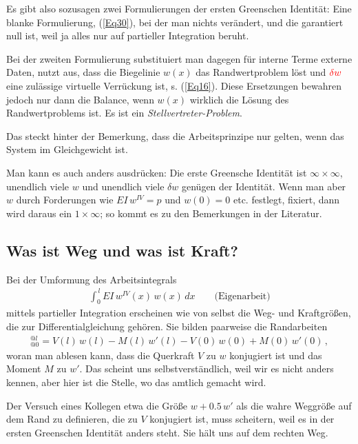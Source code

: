 {{{{{Es gibt also sozusagen zwei Formulierungen der ersten Greenschen Identit\"{a}t: Eine \glq blanke\grq{} Formulierung, (\ref{Eq30}), bei der man nichts ver\"{a}ndert, und die garantiert null ist, weil ja alles nur auf partieller Integration beruht.

Bei der zweiten Formulierung substituiert man dagegen f\"{u}r \glq interne\grq{} Terme \glq externe\grq{} Daten, nutzt aus, dass die Biegelinie $w(x) $ das Randwertproblem l\"{o}st und $\textcolor{red}{\delta w} $ eine zul\"{a}ssige virtuelle Verr\"{u}ckung ist, s. (\ref{Eq16}). Diese Ersetzungen bewahren jedoch nur dann die Balance, wenn $w(x) $ wirklich die L\"{o}sung des Randwertproblems ist. Es ist ein {\em Stellvertreter-Problem\/}.

Das steckt hinter der Bemerkung, dass die Arbeitsprinzipe nur gelten, wenn das System im Gleichgewicht ist.

Man kann es auch anders ausdr\"{u}cken:  Die erste Greensche Identit\"{a}t ist $\infty \times \infty$,  unendlich viele $w $ und unendlich viele $\delta w $ gen\"{u}gen der Identit\"{a}t. Wenn man aber $w$ durch Forderungen wie $EI\,w^{IV} =  p$ und $w(0) = 0$ etc. festlegt, fixiert,  dann wird daraus ein $1 \times \infty$; so kommt es zu den Bemerkungen in der Literatur.



{\textcolor{sectionTitleBlue}{\section{Was ist Weg und was ist Kraft?}}}
Bei der Umformung des Arbeitsintegrals
\begin{align}
\int_0^{\,l} EI\,w^{IV}(x)\, w(x)\,dx \qquad \text{(Eigenarbeit)}
\end{align}
mittels partieller Integration erscheinen wie von selbst die Weg- und Kraftgr\"{o}{\ss}en, die zur Differentialgleichung geh\"{o}ren. Sie bilden paarweise die Rand\-arbeiten
\begin{align}
[V\, w - M\,w']_{@0}^{@l} = V(l)\,w(l) - M(l)\,w'(l) - V(0)\,w(0) + M(0)\,w'(0)\,,
\end{align}
woran man ablesen kann, dass die Querkraft $V$ zu $w$ konjugiert ist und das Moment $M$ zu $w'$. Das scheint uns selbstverst\"{a}ndlich, weil wir es nicht anders kennen, aber hier ist die Stelle, wo das amtlich gemacht wird.

Der Versuch eines Kollegen etwa die Gr\"{o}{\ss}e $w + 0.5\,w'$ als die \glq wahre\grq{} Weggr\"{o}{\ss}e auf dem Rand zu definieren, die zu $V$ konjugiert ist, muss scheitern, weil es in der ersten Greenschen Identit\"{a}t anders steht. Sie h\"{a}lt uns auf dem rechten Weg.

}}}}}
